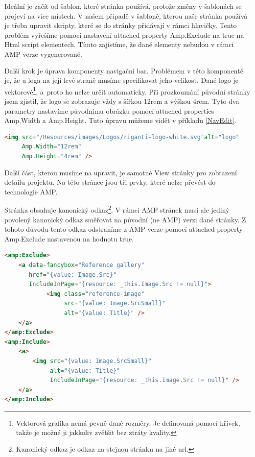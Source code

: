 Ideální je začít od šablon, které stránka používá, protože změny v šablonách se projeví na více místech. V našem případě v šabloně, kterou naše stránka používá je třeba upravit skripty, které se do stránky přidávají v rámci hlavičky. Tento problém vyřešíme pomocí nastavení attached property Amp.Exclude na true na Html script elementech. Tímto zajistíme, že dané elementy nebudou v rámci AMP verze vygenerované.

Další krok je úprava komponenty navigační bar. Problémem v této komponentě je, že u loga na její levé straně musíme specifikovat jeho velikost. Dané logo je vektorové\footnote{Vektorová grafika nemá pevně dané rozměry. Je definovaná pomocí křivek, takže je možné ji jakkoliv zvětšit bez ztráty kvality.}, a~proto ho nelze určit automaticky. Při prozkoumání původní stránky jsem zjistil, že logo se zobrazuje vždy s šířkou 12rem a výškou 4rem. Tyto dva parametry nastavíme původnímu obrázku pomocí attached properties Amp.Width a Amp.Height. Tuto úpravu můžeme vidět v příkladu \ref{NavEdit}.
\begin{lstlisting}[language=html, caption=Upřesnění velikosti obrázku.,label=NavEdit,captionpos=t]
<img src="/Resources/images/Logos/riganti-logo-white.svg"alt="logo"
     Amp.Width="12rem"
     Amp.Height="4rem" />
\end{lstlisting}

Další část, kterou musíme na upravit, je samotné View stránky pro zobrazení detailu projektu. Na této stránce jsou tři prvky, které nelze převést do technologie AMP.

Stránka obsahuje kanonický odkaz\footnote{Kanonický odkaz je odkaz na stejnou stránku na jiné url.}. V rámci AMP stránek musí ale jediný povolený kanonický odkaz směřovat na původní (ne AMP) verzi dané stránky. Z tohoto důvodu tento odkaz odstraníme z AMP verze pomocí attached property Amp.Exclude nastavenou na hodnotu true.

\begin{lstlisting}[language=html, caption=Odstranění komponenty fancybox.,label=fancybox,captionpos=t]
<amp:Exclude>
	<a data-fancybox="Reference gallery"
	   href="{value: Image.Src}"
	   IncludeInPage="{resource: _this.Image.Src != null}">
	        <img class="reference-image"
	             src="{value: Image.SrcSmall}"
	             alt="{value: Title}" />
	</a>
</amp:Exclude>
<amp:Include>
	<a>
		<img src="{value: Image.SrcSmall}"
		     alt="{value: Title}"
		     IncludeInPage="{resource: _this.Image.Src != null}" />
	</a>
</amp:Include>

\end{lstlisting}

